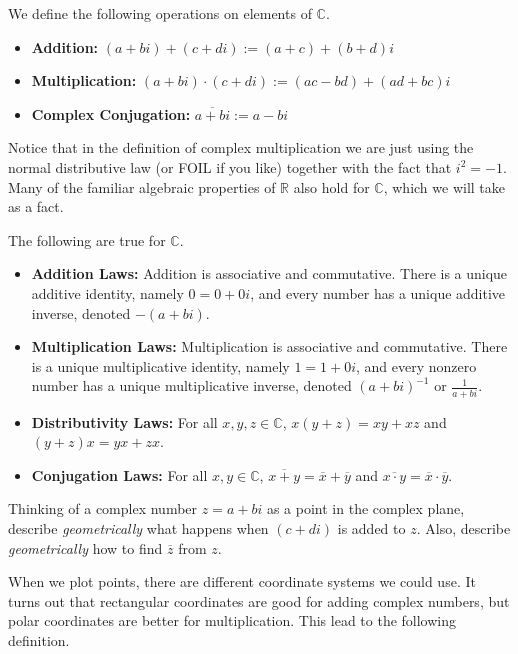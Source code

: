 \begin{definition}
We define the following operations on elements of $\mathbb{C}$. 
\begin{itemize}
\item \textbf{Addition:} $(a+bi) + (c+di) := (a+c) + (b+d)i$
\item \textbf{Multiplication:} $(a+bi) \cdot (c+di) := (ac-bd) + (ad+bc)i$
\item \textbf{Complex Conjugation:} $\overline{a+bi} := a-bi$
\end{itemize}
\end{definition}

Notice that in the definition of complex multiplication we are just using the normal distributive law (or FOIL if you like) together with the fact that $i^2 = -1$. Many of the familiar algebraic properties of $\mathbb{R}$ also hold for $\mathbb{C}$, which we will take as a fact.

\begin{fact}\label{fact.ComplexLaws} The following are true for $\mathbb{C}$.
\begin{itemize}
\item \textbf{Addition Laws:} Addition is associative and commutative. There is a unique additive identity, namely $0 = 0 + 0i$, and every number has a unique additive inverse, denoted $-(a+bi)$.
\item \textbf{Multiplication Laws:} Multiplication is associative and commutative. There is a unique multiplicative identity, namely $1 = 1 + 0i$, and every nonzero number has a unique multiplicative inverse, denoted $(a+bi)^{-1}$ or $\frac{1}{a+bi}$.
\item \textbf{Distributivity Laws:} For all $x,y,z \in \mathbb{C}$, $x(y+z) = xy+xz$ and $(y+z)x = yx+zx$.
\item \textbf{Conjugation Laws:} For all $x,y \in \mathbb{C}$, $\overline{x+y} = \overline{x} + \overline{y}$ and $\overline{x\cdot y} = \overline{x}\cdot\overline{y}$.
\end{itemize}
\end{fact}

\begin{problem}
Thinking of a complex number $z=a+bi$ as a point in the complex plane, describe \emph{geometrically} what happens when $(c+di)$ is added to $z$. Also, describe \emph{geometrically}  how to find $\overline{z}$ from $z$.
\end{problem}

When we plot points, there are different coordinate systems we could use. It turns out that  rectangular coordinates are good for adding complex numbers, but polar coordinates are better for multiplication. This lead to the following definition.

